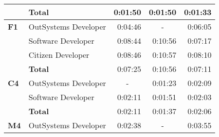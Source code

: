 \begin{table}[tb]
\begin{tabular}{llrrr}
                            & \textbf{Total}       & 0:01:50                                                           & 0:01:50                                                                 & 0:01:33                                                       \\ \hline
  \textbf{F1}               & OutSystems Developer & 0:04:46                                                           & \multicolumn{1}{c}{-}                                                   & 0:06:05                                                       \\
                            & Software Developer   & 0:08:44                                                           & 0:10:56                                                                 & 0:07:17                                                       \\
                            & Citizen Developer    & 0:08:46                                                           & 0:10:57                                                                 & 0:08:10                                                       \\
                            & \textbf{Total}       & 0:07:25                                                           & 0:10:56                                                                 & 0:07:11                                                       \\ \hline
  \textbf{C4}               & OutSystems Developer & \multicolumn{1}{c}{-}                                             & 0:01:23                                                                 & 0:02:09                                                       \\
                            & Software Developer   & 0:02:11                                                           & 0:01:51                                                                 & 0:02:03                                                       \\
                            & \textbf{Total}       & 0:02:11                                                           & 0:01:37                                                                 & 0:02:06                                                       \\ \hline
  \textbf{M4}               & OutSystems Developer & 0:02:38                                                           & \multicolumn{1}{c}{-}                                                   & 0:03:55                                                       \\

\end{tabular}
\end{table}
